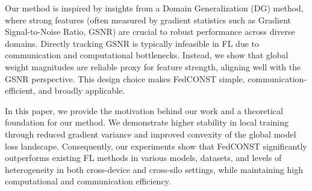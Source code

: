 \documentclass{article}
\theoremstyle{plain}
\theoremstyle{definition}
\theoremstyle{remark}
\begin{document}
Our method is inspired by insights from a Domain Generalization (DG) method\cite{adg}, where strong features (often measured by gradient statistics such as Gradient Signal-to-Noise Ratio, GSNR) are crucial to robust performance across diverse domains. Directly tracking GSNR is typically infeasible in FL due to communication and computational bottlenecks. Instead, we show that global weight magnitudes are reliable proxy for feature strength, aligning well with the GSNR perspective. This design choice makes FedCONST simple, communication-efficient, and broadly applicable.



In this paper, we provide the motivation behind our work and a theoretical foundation for our method. We demonstrate higher stability in local training through reduced gradient variance and improved convexity of the global model loss landscape. Consequently, our experiments show that FedCONST significantly outperforms existing FL methods in various models, datasets, and levels of heterogeneity in both cross-device and cross-silo settings, while maintaining high computational and communication efficiency.
\end{document}
